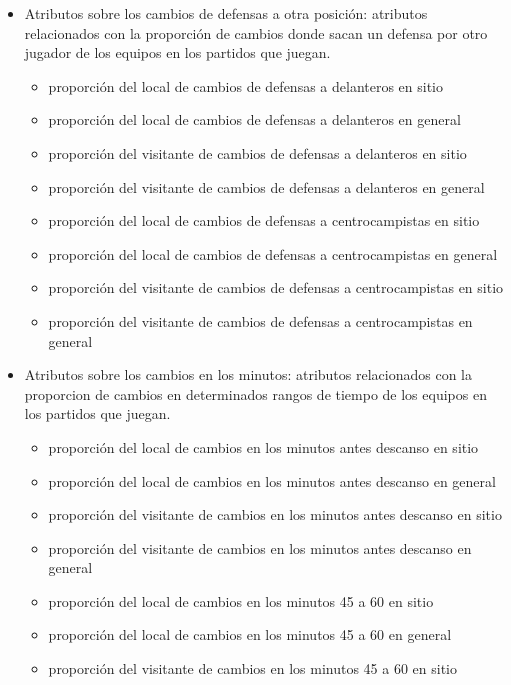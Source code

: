 \begin{itemize}
\begin{itemize}
          \end{itemize}
    \item Atributos sobre los cambios de defensas a otra posición: atributos relacionados con la proporción de cambios donde sacan un defensa por otro jugador de los equipos en los partidos que juegan.
          \begin{itemize}
              \item proporción del local de cambios de defensas a delanteros en sitio
              \item proporción del local de cambios de defensas a delanteros en general
              \item proporción del visitante de cambios de defensas a delanteros en sitio
              \item proporción del visitante de cambios de defensas a delanteros en general
              \item proporción del local de cambios de defensas a centrocampistas en sitio
              \item proporción del local de cambios de defensas a centrocampistas en general
              \item proporción del visitante de cambios de defensas a centrocampistas en sitio
              \item proporción del visitante de cambios de defensas a centrocampistas en general
          \end{itemize}
    \item Atributos sobre los cambios en los minutos: atributos relacionados con la proporcion de cambios en determinados rangos de tiempo de los equipos en los partidos que juegan.
          \begin{itemize}
              \item proporción del local de cambios en los minutos antes descanso en sitio
              \item proporción del local de cambios en los minutos antes descanso en general
              \item proporción del visitante de cambios en los minutos antes descanso en sitio
              \item proporción del visitante de cambios en los minutos antes descanso en general
              \item proporción del local de cambios en los minutos 45 a 60 en sitio
              \item proporción del local de cambios en los minutos 45 a 60 en general
              \item proporción del visitante de cambios en los minutos 45 a 60 en sitio

\end{itemize}
\end{itemize}
